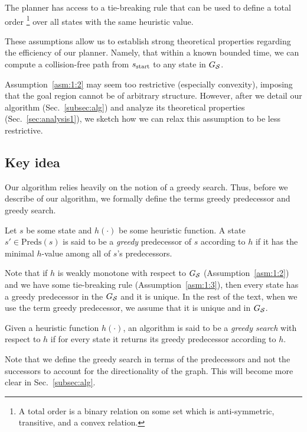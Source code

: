 \documentclass[a4paper]{report}
\begin{document}
\vspace{2mm}\begin{assumption} \label{asm:1:3} The planner has access to a tie-breaking rule that can be used to define a total order \footnote{A total order is a binary relation on some set which is anti-symmetric, transitive, and a convex relation.} over all states with the same heuristic value.
\end{assumption}

These assumptions allow us to establish strong theoretical properties regarding the efficiency of our planner. Namely, that
within a known bounded time, we can compute a collision-free path from $s_{\textrm{start}}$ to any state in $G_\mathcal{S}$. 


Assumption~\ref{asm:1:2} may seem too restrictive (especially convexity), imposing that the goal region cannot be of arbitrary structure. However, after we detail our algorithm (Sec.~\ref{subsec:alg}) and analyze its theoretical properties (Sec.~\ref{sec:analysis1}), we sketch how we can relax this assumption to be less restrictive.


 
\subsection{Key idea}
\label{sec:key}
Our algorithm relies heavily on the notion of a greedy search.  Thus, before we describe of our algorithm, we formally define the terms greedy predecessor and greedy search.

\vspace{2mm}
\begin{definition}
\label{def:greedy-suc}
  Let $s$ be some state and $h(\cdot)$ be some heuristic function.
  A state $s' \in \text{Preds}(s)$ is said to be a \emph{greedy} predecessor of $s$ according to $h$ if it has the minimal $h$-value among all of $s$'s predecessors.
\end{definition}
Note that 
if $h$ is weakly monotone with respect to $G_\mathcal{S}$
(Assumption~\ref{asm:1:2}) 
and we have some tie-breaking rule
(Assumption~\ref{asm:1:3}), then every state has a greedy predecessor in the $G_\mathcal{S}$ and it is unique.
In the rest of the text, when we use the term greedy predecessor, we assume that it is unique and in $G_\mathcal{S}$.

\vspace{2mm}
\begin{definition}
  Given a heuristic function $h(\cdot)$,
  an algorithm is said to be a \emph{greedy search}  with respect to $h$ if for every state it returns its greedy predecessor according to $h$.
\end{definition}
Note that we define the greedy search in terms of the predecessors and not the successors to account for the directionality of the graph. This will become more clear in Sec.~\ref{subsec:alg}.
\end{document}

